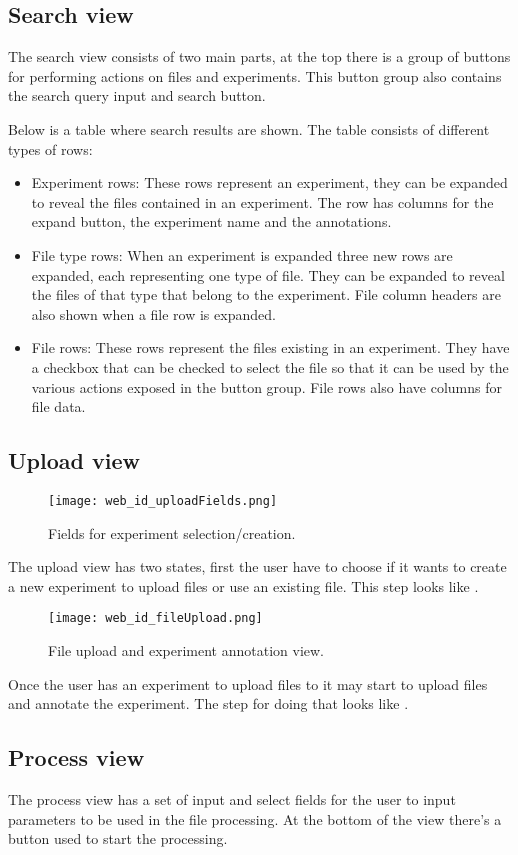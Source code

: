 \subsection{Search view}
The search view consists of two main parts, at the top there is a group of buttons for performing actions on files and experiments. This button group also contains the search query input and search button.

Below is a table where search results are shown. The table consists of different types of rows:
\begin{itemize}
	\item Experiment rows: These rows represent an experiment, they can be expanded to reveal the files contained in an experiment. The row has columns for the expand button, the experiment name and the annotations.
	\item File type rows: When an experiment is expanded three new rows are expanded, each representing one type of file. They can be expanded to reveal the files of that type that belong to the experiment. File column headers are also shown when a file row is expanded.
	\item File rows: These rows represent the files existing in an experiment. They have a checkbox that can be checked to select the file so that it can be used by the various actions exposed in the button group. File rows also have columns for file data.
\end{itemize}
\subsection{Upload view}
\begin{figure}[h]
\centering
\texttt{[image: web\_id\_uploadFields.png]}
\caption{\label{fig:web_id_uploadFields}Fields for experiment selection/creation.}
\end{figure}
The upload view has two states, first the user have to choose if it wants to create a new experiment to upload files or use an existing file. This step looks like .

\begin{figure}[h]
\centering
\texttt{[image: web\_id\_fileUpload.png]}
\caption{\label{fig:web_id_fileUpload}File upload and experiment annotation view.}
\end{figure}

Once the user has an experiment to upload files to it may start to upload files and annotate the experiment. The step for doing that looks like .

\subsection{Process view}
The process view has a set of input and select fields for the user to input parameters to be used in the file processing. At the bottom of the view there’s a button used to start the processing.

